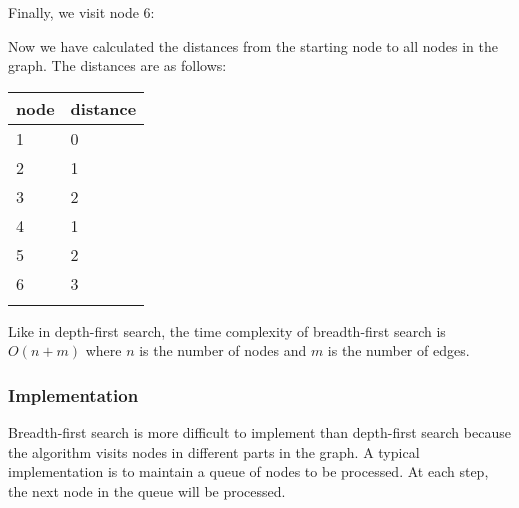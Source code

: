 Finally, we visit node 6:
\begin{center}
\end{center}
Now we have calculated the distances
from the starting node to all nodes in the graph.
The distances are as follows:

\begin{tabular}{ll}
\\
node & distance \\
\hline
1 & 0 \\
2 & 1 \\
3 & 2 \\
4 & 1 \\
5 & 2 \\
6 & 3 \\
\\
\end{tabular}

Like in depth-first search,
the time complexity of breadth-first search
is $O(n+m)$ where $n$ is the number of nodes
and $m$ is the number of edges.

\subsubsection*{Implementation}

Breadth-first search is more difficult
to implement than depth-first search
because the algorithm visits nodes
in different parts in the graph.
A typical implementation is to maintain
a queue of nodes to be processed.
At each step, the next node in the queue
will be processed.


